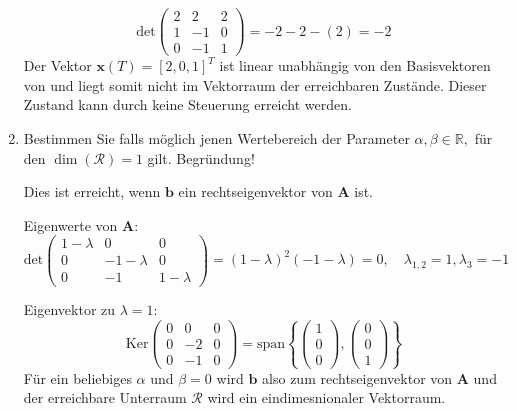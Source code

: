 \documentclass[crop=false]{standalone}
\begin{document}
\begin{task}
\begin{enumerate}[i]
\begin{solution}
\[\text{det}
\begin{pmatrix}
2 & 2 & 2\\
1 & -1 & 0\\
0 & -1 & 1
\end{pmatrix}
=
-2 -2 -(2) = -2
\]
Der Vektor $\mathbf{x}(T)=[2,0,1]^{T}$ ist linear unabhängig von den Basisvektoren von  und liegt somit nicht im Vektorraum der erreichbaren Zustände. Dieser Zustand kann durch keine Steuerung erreicht werden.
\end{solution}
  \item Bestimmen Sie falls möglich jenen Wertebereich der Parameter $\alpha, \beta \in \mathbb{R},$ für den $\operatorname{dim}(\mathcal{R})=1$ gilt. Begründung!
\begin{solution}
Dies ist erreicht, wenn $\mathbf{b}$ ein rechtseigenvektor von $\mathbf{A}$ ist.

Eigenwerte von $\mathbf{A}$: $
\text{det}
\begin{pmatrix}
1-\lambda & 0 & 0\\
0 & -1-\lambda & 0\\
0 & -1 & 1-\lambda
\end{pmatrix}
=\left(1-\lambda\right)^2\left(-1-\lambda\right)=0, \quad \lambda_{1,2} = 1, \lambda_3 = -1$


Eigenvektor zu $\lambda = 1$:
\[ \text{Ker}\begin{pmatrix}
0 & 0 & 0 \\
0 & -2 & 0\\
0 & -1 & 0
\end{pmatrix} = \text{span}\left\{ \begin{pmatrix}
1 \\ 0 \\ 0
\end{pmatrix}, \begin{pmatrix}
0 \\ 0 \\ 1
\end{pmatrix}\right\} \]
Für ein beliebiges $\alpha$ und $\beta=0$ wird $\mathbf{b}$ also zum rechtseigenvektor von $\mathbf{A}$ und der erreichbare Unterraum $\mathcal{R}$ wird ein eindimesnionaler Vektorraum.
\end{solution}
\end{enumerate}
\end{task}
\end{document}
